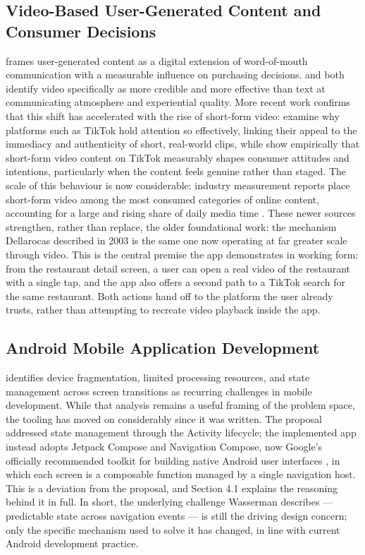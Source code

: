 \documentclass[12pt, a4paper]{article}
\begin{document}
\subsection{Video-Based User-Generated Content and Consumer Decisions}

\citet{dellarocas2003} frames user-generated content as a digital extension of word-of-mouth communication with a measurable influence on purchasing decisions. \citet{kaplan2010} and \citet{cheung2009} both identify video specifically as more credible and more effective than text at communicating atmosphere and experiential quality. More recent work confirms that this shift has accelerated with the rise of short-form video: \citet{montag2021} examine why platforms such as TikTok hold attention so effectively, linking their appeal to the immediacy and authenticity of short, real-world clips, while \citet{barta2023} show empirically that short-form video content on TikTok measurably shapes consumer attitudes and intentions, particularly when the content feels genuine rather than staged. The scale of this behaviour is now considerable: industry measurement reports place short-form video among the most consumed categories of online content, accounting for a large and rising share of daily media time \citep{datareportal2024}. These newer sources strengthen, rather than replace, the older foundational work: the mechanism Dellarocas described in 2003 is the same one now operating at far greater scale through video. This is the central premise the app demonstrates in working form: from the restaurant detail screen, a user can open a real video of the restaurant with a single tap, and the app also offers a second path to a TikTok search for the same restaurant. Both actions hand off to the platform the user already trusts, rather than attempting to recreate video playback inside the app.

\subsection{Android Mobile Application Development}

\citet{wasserman2010} identifies device fragmentation, limited processing resources, and state management across screen transitions as recurring challenges in mobile development. While that analysis remains a useful framing of the problem space, the tooling has moved on considerably since it was written. The proposal addressed state management through the Activity lifecycle; the implemented app instead adopts Jetpack Compose and Navigation Compose, now Google's officially recommended toolkit for building native Android user interfaces \citep{jetpack_compose}, in which each screen is a composable function managed by a single navigation host. This is a deviation from the proposal, and Section 4.1 explains the reasoning behind it in full. In short, the underlying challenge Wasserman describes --- predictable state across navigation events --- is still the driving design concern; only the specific mechanism used to solve it has changed, in line with current Android development practice.
\end{document}
